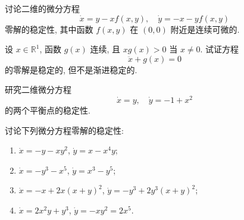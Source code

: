 \begin{exercise}
  讨论二维的微分方程
  \[\dot{x} = y-xf(x,y),\quad \dot{y} = -x-yf(x,y)\]
  零解的稳定性, 其中函数 $f(x,y)$ 在 $(0,0)$ 附近是连续可微的.
\end{exercise}



\begin{exercise}
  设 $x\in\mathbb{R}^1$, 函数 $g(x)$ 连续, 且 $xg(x)>0$ 当 $x\neq 0$. 试证方程
  \[\ddot{x}+g(x) = 0\]
  的零解是稳定的, 但不是渐进稳定的.
\end{exercise}



\begin{exercise}
  研究二维微分方程
  \[\dot{x} = y,\quad \dot{y} = -1+x^2\]
  的两个平衡点的稳定性.
\end{exercise}



\begin{exercise}
  讨论下列微分方程零解的稳定性:
  \begin{enumerate}[(1)]
    \item $\dot{x} = -y-xy^2$, $\dot{y} = x-x^4y$;
    \item $\dot{x} = -y^3-x^5$, $\dot{y} = x^3-y^5$;
    \item $\dot{x} = -x+2x(x+y)^2$, $\dot{y} = -y^3+2y^3(x+y)^2$;
    \item $\dot{x} = 2x^2y+y^3$, $\dot{y} = -xy^2=2x^5$.
  \end{enumerate}
\end{exercise}